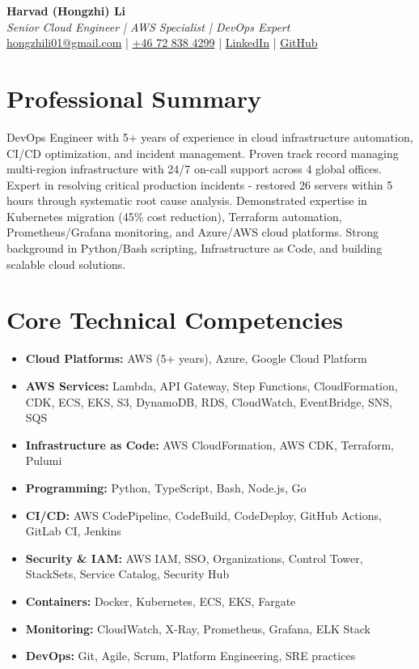 \documentclass[11pt,a4paper]{article}
\begin{document}
\begin{center}
{\LARGE \textbf{Harvad (Hongzhi) Li}}\\[10pt]
{\Large \textit{Senior Cloud Engineer | AWS Specialist | DevOps Expert}}\\[10pt]
\textcolor{linkedinblue}{\href{mailto:hongzhili01@gmail.com}{hongzhili01@gmail.com} | \href{tel:+46728384299}{+46 72 838 4299} | \href{https://www.linkedin.com/in/harvad/}{LinkedIn} | \href{https://github.com/bluehawana}{GitHub}}
\end{center}

\vspace{8pt}

\section*{Professional Summary}

DevOps Engineer with 5+ years of experience in cloud infrastructure automation, CI/CD optimization, and incident management. Proven track record managing multi-region infrastructure with 24/7 on-call support across 4 global offices. Expert in resolving critical production incidents - restored 26 servers within 5 hours through systematic root cause analysis. Demonstrated expertise in Kubernetes migration (45\% cost reduction), Terraform automation, Prometheus/Grafana monitoring, and Azure/AWS cloud platforms. Strong background in Python/Bash scripting, Infrastructure as Code, and building scalable cloud solutions.

\section*{Core Technical Competencies}

\begin{itemize}[leftmargin=*, itemsep=2pt]
\item \textbf{Cloud Platforms:} AWS (5+ years), Azure, Google Cloud Platform
\item \textbf{AWS Services:} Lambda, API Gateway, Step Functions, CloudFormation, CDK, ECS, EKS, S3, DynamoDB, RDS, CloudWatch, EventBridge, SNS, SQS
\item \textbf{Infrastructure as Code:} AWS CloudFormation, AWS CDK, Terraform, Pulumi
\item \textbf{Programming:} Python, TypeScript, Bash, Node.js, Go
\item \textbf{CI/CD:} AWS CodePipeline, CodeBuild, CodeDeploy, GitHub Actions, GitLab CI, Jenkins
\item \textbf{Security \& IAM:} AWS IAM, SSO, Organizations, Control Tower, StackSets, Service Catalog, Security Hub
\item \textbf{Containers:} Docker, Kubernetes, ECS, EKS, Fargate
\item \textbf{Monitoring:} CloudWatch, X-Ray, Prometheus, Grafana, ELK Stack
\item \textbf{DevOps:} Git, Agile, Scrum, Platform Engineering, SRE practices
\end{itemize}
\end{document}
